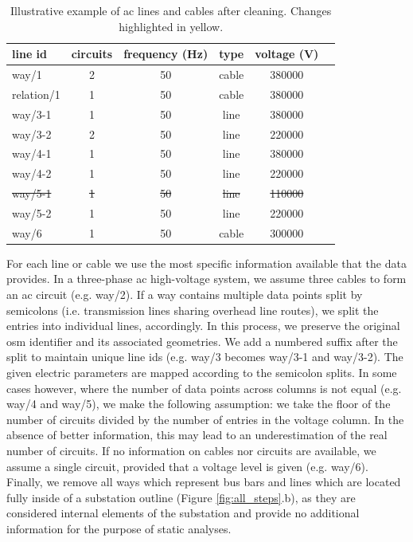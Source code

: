 \documentclass[fleqn,10pt]{wlscirep}
\let\autocite\cite
\begin{document}
\begin{table}[!htbp]
    \centering
    \begin{tabular}{|l|c|c|c|c|c|}
    \hline
    \textbf{line id} & \textbf{circuits} & \textbf{frequency (Hz)} & \textbf{type} & \textbf{voltage (V)} \\
    \hline
    way/1 & 2 & 50 & cable & \SI{380000}{} \\
    \hline
    relation/1 & \cellcolor{yellow!50}1 & 50 & cable & \SI{380000}{} \\
    \hline
    way/3-1 & \cellcolor{yellow!50}1 & 50 & line & \cellcolor{yellow!50}\SI{380000}{} \\
    \hline
    way/3-2 & \cellcolor{yellow!50}2 & 50 & line & \cellcolor{yellow!50}\SI{220000}{} \\
    \hline
    way/4-1 & \cellcolor{yellow!50}1 & \cellcolor{yellow!50}50 & line & \cellcolor{yellow!50}\SI{380000}{} \\
    \hline
    way/4-2 & \cellcolor{yellow!50}1 & \cellcolor{yellow!50}50 & line & \cellcolor{yellow!50}\SI{220000}{} \\
    \hline
    \sout{way/5-1} & \cellcolor{yellow!50}\sout{1} & \sout{50} & \sout{line} & \cellcolor{yellow!50}\sout{\SI{110000}{}} \\
    \hline
    way/5-2 & \cellcolor{yellow!50}1 & 50 & line & \cellcolor{yellow!50}\SI{220000}{} \\
    \hline
    way/6 & \cellcolor{yellow!50}1 & 50 & cable & \SI{300000}{}\\
    \hline
    \end{tabular}
    \caption{Illustrative example of \acrshort{ac} lines and cables after cleaning. Changes highlighted in yellow.}
    \label{tab:aclines_example2} 
\end{table}

For each line or cable we use the most specific information available that the data provides. In a three-phase \acrshort{ac} high-voltage system, we assume three cables to form an \acrshort{ac} circuit (e.g. way/2).\autocite{kirschenPowerSystemsFundamental2024} If a way contains multiple data points split by semicolons (i.e. transmission lines sharing overhead line routes), we split the entries into individual lines, accordingly. In this process, we preserve the original \gls{osm} identifier and its associated geometries. We add a numbered suffix after the split to maintain unique line ids (e.g. way/3 becomes way/3-1 and way/3-2). The given electric parameters are mapped according to the semicolon splits. In some cases however, where the number of data points across columns is not equal (e.g. way/4 and way/5), we make the following assumption: we take the floor of the number of circuits divided by the number of entries in the voltage column. In the absence of better information, this may lead to an underestimation of the real number of circuits. If no information on cables nor circuits are available, we assume a single circuit, provided that a voltage level is given (e.g. way/6). Finally, we remove all ways which represent bus bars and lines which are located fully inside of a substation outline (Figure \ref{fig:all_steps}.b), as they are considered internal elements of the substation and provide no additional information for the purpose of static analyses.
\end{document}
